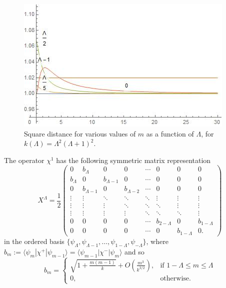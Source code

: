 \begin{figure}
    \centering
    \includegraphics[width = 2\textwidth/3]{images/R^2.jpg}
    \caption{Square distance for various values of $m$ as a function of $\Lambda$, for $k(\Lambda) = \Lambda^2(\Lambda+1)^2$.}
    \label{fig:R2Chi}
\end{figure}

The operator $\chi^1$ has the following symmetric matrix representation
\begin{equation}
    X^\Lambda = \frac{1}{2} 
    \begin{pmatrix} 
    0 & b_\Lambda & 0 & 0& \cdots & 0& 0 & 0 \\
    b_\Lambda & 0 & b_{\Lambda - 1} & 0 & \cdots & 0 & 0 & 0\\
    0 & b_{\Lambda-1} & 0 & b_{\Lambda - 2} & \cdots & 0 & 0 &0\\
    \vdots & \vdots & \ddots & \ddots & \ddots & \vdots & \vdots & \vdots\\
    \vdots & \vdots & \vdots & \ddots & \ddots & \ddots & \vdots & \vdots\\
    \vdots & \vdots & \vdots & \vdots & \ddots & \ddots & \ddots & \vdots\\
    0 & 0 & 0 & 0 & \cdots & b_{2-\Lambda} & 0 & b_{1-\Lambda}\\
    0 & 0 & 0 &0 & \cdots & 0 & b_{1-\Lambda} & 0.
    \end{pmatrix}                                                                                                                           
\end{equation}
in the ordered basis $\{\psi_\Lambda, \psi_{\Lambda - 1}, \dots, \psi_{1-\Lambda}, \psi_{-\Lambda}\}$, where $b_m := \langle \psi_m | \chi^+ | \psi_{m-1} \rangle = \langle \psi_{m-1} | \chi ^- | \psi_m\rangle$ and so
\begin{equation}\label{equationbmD2}
    b_m = \begin{cases}
        \sqrt{1 + \frac{m(m-1)}{k}} + O\left( \frac{m^3}{k^{3/2}} \right), & \text{if } 1- \Lambda \leq m \leq \Lambda \\
        0, & \text{otherwise}.
    \end{cases}
\end{equation}

